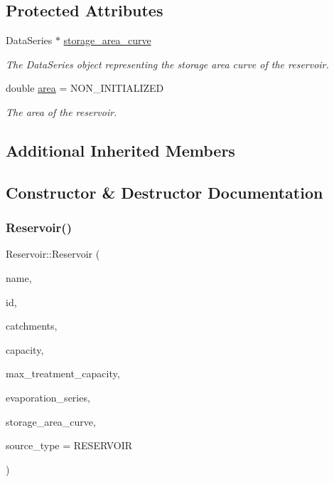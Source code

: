 \subsection*{Protected Attributes}
\begin{DoxyCompactItemize}
\item 
Data\+Series $\ast$ \mbox{\hyperlink{classReservoir_a46bd5b750963dfa9a57b247fd77ab8ff}{storage\+\_\+area\+\_\+curve}}
\begin{DoxyCompactList}\small\item\em The Data\+Series object representing the storage area curve of the reservoir. \end{DoxyCompactList}\item 
double \mbox{\hyperlink{classReservoir_a57ab55e0dde9e29a4ff97de98b09e458}{area}} = N\+O\+N\+\_\+\+I\+N\+I\+T\+I\+A\+L\+I\+Z\+ED
\begin{DoxyCompactList}\small\item\em The area of the reservoir. \end{DoxyCompactList}\end{DoxyCompactItemize}
\subsection*{Additional Inherited Members}


\subsection{Constructor \& Destructor Documentation}
\mbox{\label{classReservoir_ac9803ae5446e4e9a2631ce66817004cf}} 
\subsubsection{\texorpdfstring{Reservoir()}{Reservoir()}\hspace{0.1cm}{\footnotesize\ttfamily [1/9]}}
{\footnotesize\ttfamily Reservoir\+::\+Reservoir (\begin{DoxyParamCaption}\item[{const char $\ast$}]{name,  }\item[{const int}]{id,  }\item[{const vector$<$ \mbox{\hyperlink{classCatchment}{Catchment}} $\ast$$>$ \&}]{catchments,  }\item[{const double}]{capacity,  }\item[{const double}]{max\+\_\+treatment\+\_\+capacity,  }\item[{Evaporation\+Series \&}]{evaporation\+\_\+series,  }\item[{Data\+Series $\ast$}]{storage\+\_\+area\+\_\+curve,  }\item[{int}]{source\+\_\+type = {\ttfamily RESERVOIR} }\end{DoxyParamCaption})}



